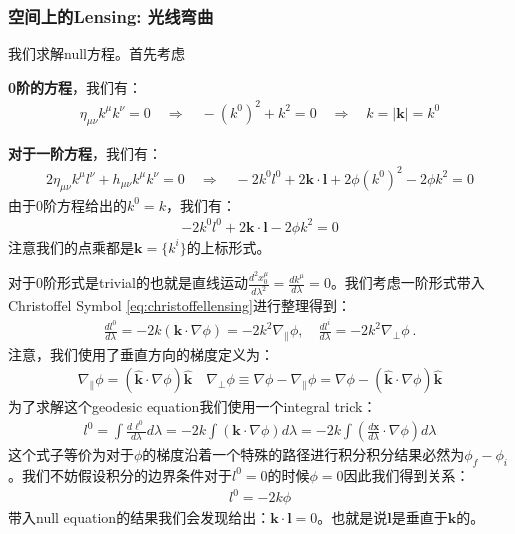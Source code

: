 \subsubsection{空间上的Lensing: 光线弯曲}

\bigskip
{}

我们求解null方程。首先考虑

\textbf{0阶的方程}，我们有：
\begin{align}
  \eta_{\mu\nu} k^\mu k^\nu = 0 \quad \Rightarrow \quad - (k^0)^2 +
  k^2 = 0 \quad \Rightarrow \quad k = |\mathbf{k}| = k^0
\end{align}

\textbf{对于一阶方程}，我们有：
\begin{align}
  2 \eta_{\mu\nu} k^\mu l^\nu + h_{\mu\nu} k^\mu k^\nu = 0 \quad
  \Rightarrow \quad -2 k^0 l^0 + 2 \mathbf{k} \cdot \mathbf{l} + 2
  \phi (k^0)^2 - 2 \phi k^2 = 0
\end{align}
由于0阶方程给出的$ k^0 = k $，我们有：
\begin{align}
  -2 k^0 l^0 + 2 \mathbf{k} \cdot \mathbf{l} - 2 \phi k^2 = 0
\end{align}
注意我们的点乘都是$ \mathbf{k} = \{k^i\} $的上标形式。

\bigskip
{}

对于0阶形式是trivial的也就是直线运动$ \frac{d^2 x_0^\mu}{d \lambda^2} = \frac{d
k^\mu}{d \lambda} = 0 $。我们考虑一阶形式带入Christoffel Symbol
\cref{eq:christoffellensing}进行整理得到：
\begin{align}
  \frac{d l^0}{d\lambda}=-2k(\mathbf{k}\cdot\nabla\phi) =
  -2k^2\nabla_\parallel\phi
  ,\quad\frac{d l^i}{d\lambda}=-2k^2\nabla_\perp\phi\mathrm{~.}
\end{align}
注意，我们使用了垂直方向的梯度定义为：
\begin{align}
  \nabla_\parallel\phi = (\hat{\mathbf{k}}\cdot\nabla\phi)\hat{\mathbf{k}} \quad
  \nabla_\perp\phi\equiv\nabla\phi-\nabla_\parallel\phi=\nabla\phi-(\hat{\mathbf{k}}\cdot\nabla\phi)\hat{\mathbf{k}}
\end{align}
为了求解这个geodesic equation我们使用一个integral trick：
\begin{align}
  l^0=\int\frac{d\ell^0}{d\lambda}d\lambda=-2k\int(\mathbf{k}\cdot\nabla\phi)d\lambda=-2k\int\left(\frac{d\mathbf{x}}{d\lambda}\cdot\nabla\phi\right)d\lambda
\end{align}
这个式子等价为对于$ \phi $的梯度沿着一个特殊的路径进行积分积分结果必然为$ \phi_f - \phi_i
$。我们不妨假设积分的边界条件对于$ l^0 = 0 $的时候$ \phi
= 0 $因此我们得到关系：
\begin{align}
  l^0 = -2k \phi
\end{align}
带入null equation的结果我们会发现给出：$ \mathbf{k} \cdot \mathbf{l} = 0 $。也就是说$
\mathbf{l} $是垂直于$ \mathbf{k} $的。


